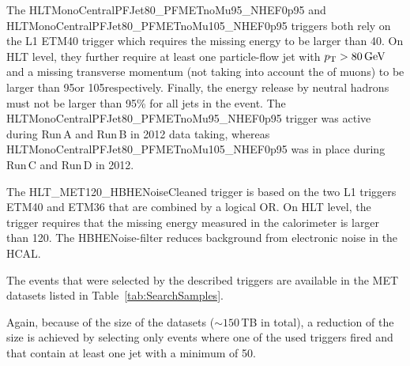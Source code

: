 The HLTMonoCentralPFJet80\_PFMETnoMu95\_NHEF0p95 and HLTMonoCentralPFJet80\_PFMETnoMu105\_NHEF0p95 triggers both rely on the L1 ETM40 trigger which requires the missing energy to be larger than 40\gev.
On HLT level, they further require at least one particle-flow jet with $p_{\text{T}}>80\,\text{Ge}\kern-0.06667em\text{V}$ and a missing transverse momentum (not taking into account the \pt of muons) to be larger than 95\gev or 105\gev respectively.
Finally, the energy release by neutral hadrons must not be larger than 95\% for all jets in the event.
The HLTMonoCentralPFJet80\_PFMETnoMu95\_NHEF0p95 trigger was active during Run\,A and Run\,B in 2012 data taking, whereas HLTMonoCentralPFJet80\_PFMETnoMu105\_NHEF0p95 was in place during Run\,C and Run\,D in 2012.

The HLT\_MET120\_HBHENoiseCleaned trigger is based on the two L1 triggers ETM40 and ETM36 that are combined by a logical OR.
On HLT level, the trigger requires that the missing energy measured in the calorimeter is larger than 120\gev.
The HBHENoise-filter reduces background from electronic noise in the HCAL.

The events that were selected by the described triggers are available in the MET datasets listed in Table~\ref{tab:SearchSamples}.
\renewcommand{\arraystretch}{1.5}
\begin{table}[!hbt]
\centering
\caption{MET data samples used in the search with the contained integrated luminosity.}
\label{tab:SearchSamples}
\end{table}  
Again, because of the size of the datasets ($\sim150\,$TB in total), a reduction of the size is achieved by selecting only events where one of the used triggers fired and that contain at least one jet with a minimum \pt of 50\gev.\\

